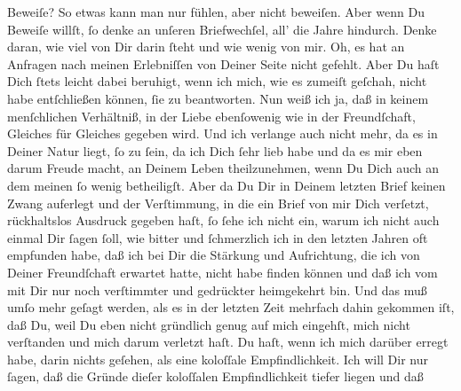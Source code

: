                Beweiſe? So etwas kann man nur fühlen, aber nicht beweiſen. Aber wenn Du Beweiſe
               willſt, ſo denke an unſeren Briefwechſel, all’ die Jahre hindurch. Denke {\pb}daran, wie viel von Dir darin ſteht und wie wenig
               von mir. Oh, es hat an Anfragen nach meinen Erlebniſſen von Deiner Seite nicht
               gefehlt. Aber Du haſt Dich ſtets leicht dabei beruhigt, wenn ich mich, wie es zumeiſt
               geſchah, nicht habe entſchließen können, ſie zu beantworten. Nun weiß ich ja, daß in
               keinem menſchlichen Verhältniß, in der Liebe ebenſowenig wie in der Freundſchaft,
               Gleiches für Gleiches gegeben wird. Und ich verlange auch nicht mehr, da es in Deiner
               Natur liegt, ſo zu ſein, da ich Dich ſehr lieb habe und da es mir eben darum Freude
               macht, an Deinem Leben theilzunehmen, wenn Du Dich auch an dem meinen ſo wenig
               betheiligſt. Aber da Du Dir in Deinem letzten Brief keinen Zwang auferlegt und der
               Verſtimmung, in die ein Brief von mir Dich verſetzt, rückhaltslos Ausdruck gegeben
               haſt, ſo ſehe ich nicht ein, warum ich nicht auch einmal Dir ſagen ſoll, wie bitter
               und ſchmerzlich \strikeout{\textcolor{gray}{h}} ich in den letzten Jahren oft  empfunden
               habe, daß {\pb}ich bei Dir die Stärkung und Aufrichtung,
               die ich von Deiner Freundſchaft erwartet hatte, nicht habe finden können und daß ich
               vom \label{K_L03194-2v}\label{K_L03194-2} mit Dir nur noch
               verſtimmter und gedrückter heimgekehrt bin. Und das muß umſo mehr geſagt werden, als
               es in der letzten Zeit mehrfach dahin gekommen iſt, daß Du, weil Du eben nicht
               gründlich genug auf mich eingehſt, mich \strikeout{\textcolor{gray}{×}\-\textcolor{gray}{×}} nicht verſtanden und mich darum verletzt haſt. Du haſt, wenn ich mich darüber
               erregt habe, darin nichts geſehen, als eine koloſſale Empfindlichkeit. Ich will Dir
               nur ſagen, daß die Gründe dieſer koloſſalen Empfindlichkeit tiefer liegen und daß
